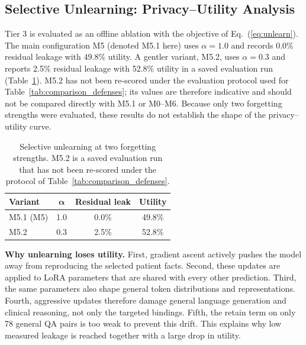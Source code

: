 \documentclass[lettersize,journal]{IEEEtran}
\begin{document}
\subsection{Selective Unlearning: Privacy--Utility Analysis}
\label{sec:unlearn_analysis}
Tier 3 is evaluated as an offline ablation with the objective of Eq.~(\ref{eq:unlearn}). The main configuration M5 (denoted M5.1 here) uses $\alpha=1.0$ and records 0.0\% residual leakage with 49.8\% utility. A gentler variant, M5.2, uses $\alpha=0.3$ and reports 2.5\% residual leakage with 52.8\% utility in a saved evaluation run (Table~\ref{tab:unlearn_alpha}). M5.2 has not been re-scored under the evaluation protocol used for Table~\ref{tab:comparison_defenses}; its values are therefore indicative and should not be compared directly with M5.1 or M0--M6. Because only two forgetting strengths were evaluated, these results do not establish the shape of the privacy--utility curve.

\begin{table}[!t]
\caption{Selective unlearning at two forgetting strengths. M5.2 is a saved evaluation run that has not been re-scored under the protocol of Table~\ref{tab:comparison_defenses}.\label{tab:unlearn_alpha}}
\centering
\begin{tabular}{|l|c|c|c|}
\hline
\textbf{Variant} & $\boldsymbol{\alpha}$ & \textbf{Residual leak} & \textbf{Utility}\\
\hline
M5.1 (M5) & 1.0 & 0.0\% & 49.8\%\\
\hline
M5.2 & 0.3 & 2.5\% & 52.8\%\\
\hline
\end{tabular}
\end{table}

\textbf{Why unlearning loses utility.} First, gradient ascent actively pushes the model away from reproducing the selected patient facts. Second, these updates are applied to LoRA parameters that are shared with every other prediction. Third, the same parameters also shape general token distributions and representations. Fourth, aggressive updates therefore damage general language generation and clinical reasoning, not only the targeted bindings. Fifth, the retain term on only 78 general QA pairs is too weak to prevent this drift. This explains why low measured leakage is reached together with a large drop in utility.
\end{document}
